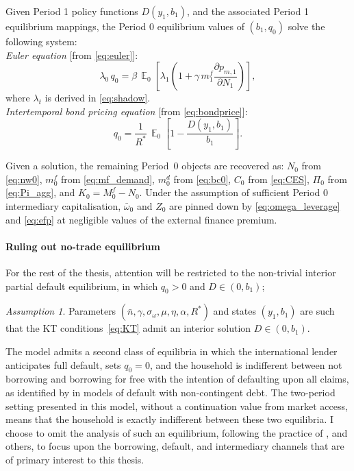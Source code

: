 \documentclass[11pt]{article}
\DeclareMathOperator{\E}{\mathbb{E}}
\theoremstyle{definition}
\theoremstyle{plain}
\theoremstyle{remark}
\newtheorem{assumption}{Assumption}
\newcommand{\mf}{m^{f}}
\newcommand{\md}{m^{d}}
\newcommand{\Rstar}{R^{*}}
\begin{document}
Given Period 1 policy functions $D(y_1,b_1)$, and the associated Period 1 equilibrium mappings, the Period 0 equilibrium values of $(b_1, q_0)$ solve the following system: \\

\textit{Euler equation} [from \eqref{eq:euler}]:
\begin{equation}
\lambda_0\, q_0 = \beta\,\E_0\!\left[\lambda_1\!\left(1 + \gamma\,\mf_1 \frac{\partial p_{m,1}}{\partial N_1}\right)\right],
\end{equation}
where $\lambda_t$ is derived in \eqref{eq:shadow}.\\

\textit{Intertemporal bond pricing equation} [from \eqref{eq:bondprice}]:
\begin{equation}
    q_0 = \frac{1}{\Rstar}\,\E_0\!\left[1 - \frac{D(y_1, b_1)}{b_1}\right].
\end{equation}

Given a solution, the remaining Period~0 objects are recovered as: $N_0$ from \eqref{eq:nw0}, $\mf_0$ from 
\eqref{eq:mf_demand}, $\md_0$ from \eqref{eq:bc0}, $C_0$ from \eqref{eq:CES}, $\Pi_0$ from 
\eqref{eq:Pi_agg}, and $K_0 = M^f_0 - N_0$. Under the assumption of sufficient Period 0 intermediary capitalisation, $\bar{\omega}_0$ and $Z_0$ are pinned down by \eqref{eq:omega_leverage} and \eqref{eq:efp} at negligible values of the external finance premium.

\paragraph{Ruling out no-trade equilibrium} For the rest of the thesis, attention will be restricted to the non-trivial interior partial default equilibrium, in which $q_0>0$ and $D\in (0,b_1)$;

\begin{assumption}\label{ass:interior}
Parameters $(\bar{n}, \gamma, \sigma_\omega, \mu, \eta, \alpha, R^*)$ and states $(y_1, b_1)$ are such that the KT conditions~\eqref{eq:KT} admit an interior solution $D \in (0, b_1)$.
\end{assumption}

The model admits a second class of equilibria in which the international lender anticipates full default, sets $q_0=0$, and the household is indifferent between not borrowing and borrowing for free with the intention of defaulting upon all claims, as identified by \citet{dubey_default_2005} in models of default with non-contingent debt. The two-period setting presented in this model, without a continuation value from market access, means that the household is exactly indifferent between these two equilibria. I choose to omit the analysis of such an equilibrium, following the practice of \citet{arellano_default_2008}, \citet{peiris_capital_2025} and others, to focus upon the borrowing, default, and intermediary channels that are of primary interest to this thesis.
\end{document}
